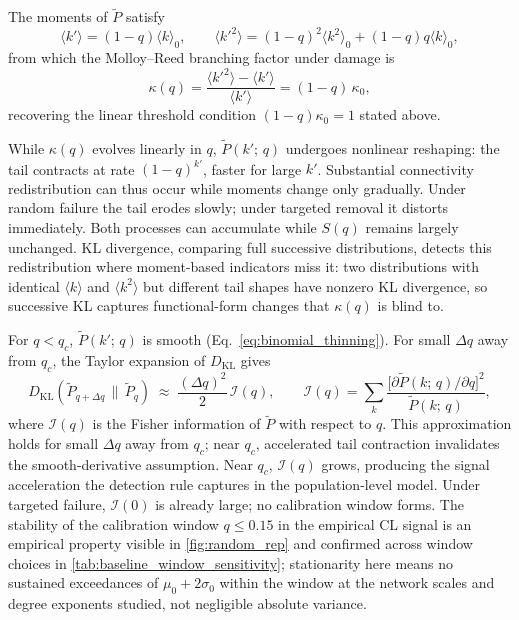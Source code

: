 \documentclass{nws}
\begin{document}
The moments of $\tilde{P}$ satisfy
\begin{equation}
\langle k' \rangle = (1-q)\langle k \rangle_0,
\qquad
\langle k'^2 \rangle = (1-q)^2\langle k^2 \rangle_0 + (1-q)q\langle k \rangle_0,
\label{eq:thinned_moments}
\end{equation}
from which the Molloy--Reed branching factor under damage is
\[
\kappa(q)
= \frac{\langle k'^2 \rangle - \langle k' \rangle}{\langle k' \rangle}
= (1-q)\,\kappa_0,
\]
recovering the linear threshold condition $(1-q)\kappa_0 = 1$ stated above.

While $\kappa(q)$ evolves linearly in $q$, $\tilde{P}(k';\,q)$ undergoes nonlinear
reshaping: the tail contracts at rate $(1-q)^{k'}$, faster for large $k'$.
Substantial connectivity redistribution can thus occur while moments change only gradually.
Under random failure the tail erodes slowly; under targeted removal it distorts
immediately. Both processes can accumulate while $S(q)$ remains largely unchanged.
KL divergence, comparing full successive distributions, detects this redistribution where
moment-based indicators miss it: two distributions with identical $\langle k \rangle$ and
$\langle k^2 \rangle$ but different tail shapes have nonzero KL divergence, so successive
KL captures functional-form changes that $\kappa(q)$ is blind to.

For $q < q_c$, $\tilde{P}(k';\,q)$ is smooth (Eq.~\ref{eq:binomial_thinning}). For small $\Delta q$ away from $q_c$, the Taylor expansion of $D_{\mathrm{KL}}$ gives
\begin{equation}
D_{\mathrm{KL}}\!\left(\tilde{P}_{q+\Delta q}\,\|\,\tilde{P}_q\right)
\;\approx\;
\frac{(\Delta q)^2}{2}\,\mathcal{I}(q),
\qquad
\mathcal{I}(q)
=
\sum_k
\frac{\bigl[\partial\tilde{P}(k;\,q)/\partial q\bigr]^2}{\tilde{P}(k;\,q)},
\label{eq:fisher_approx}
\end{equation}
where $\mathcal{I}(q)$ is the Fisher information of $\tilde{P}$ with respect to $q$.
This approximation holds for small $\Delta q$ away from $q_c$; near $q_c$, accelerated
tail contraction invalidates the smooth-derivative assumption.
Near $q_c$, $\mathcal{I}(q)$ grows, producing the signal acceleration the detection rule
captures in the population-level model. Under targeted failure, $\mathcal{I}(0)$
is already large; no calibration window forms.
The stability of the calibration window $q\le0.15$ in the empirical CL signal is an
empirical property visible in \autoref{fig:random_rep} and confirmed across window
choices in \autoref{tab:baseline_window_sensitivity}; stationarity here means no
sustained exceedances of $\mu_0+2\sigma_0$ within the window at the network scales and
degree exponents studied, not negligible absolute variance.
\end{document}
